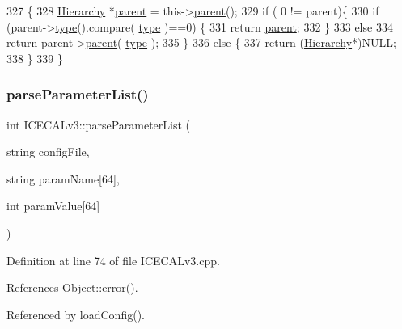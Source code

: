 \begin{DoxyCode}
327                                             \{
328   \hyperlink{classHierarchy}{Hierarchy} *\hyperlink{classHierarchy_a1c7bec8257e717f9c1465e06ebf845fc}{parent} = this->\hyperlink{classHierarchy_a1c7bec8257e717f9c1465e06ebf845fc}{parent}();
329   \textcolor{keywordflow}{if} ( 0 != parent)\{
330     \textcolor{keywordflow}{if} (parent->\hyperlink{classObject_a84f99f70f144a83e1582d1d0f84e4e62}{type}().compare( \hyperlink{classObject_a84f99f70f144a83e1582d1d0f84e4e62}{type} )==0) \{
331       \textcolor{keywordflow}{return} \hyperlink{classHierarchy_a1c7bec8257e717f9c1465e06ebf845fc}{parent};
332     \}
333     \textcolor{keywordflow}{else}
334       \textcolor{keywordflow}{return} parent->\hyperlink{classHierarchy_a1c7bec8257e717f9c1465e06ebf845fc}{parent}( \hyperlink{classObject_a84f99f70f144a83e1582d1d0f84e4e62}{type} );
335   \}
336   \textcolor{keywordflow}{else} \{
337     \textcolor{keywordflow}{return} (\hyperlink{classHierarchy}{Hierarchy}*)NULL;
338   \}
339 \}
\end{DoxyCode}
\mbox{\label{classICECALv3_a313e8166af1ce26b4026f883ad900fb9}} 
\subsubsection{\texorpdfstring{parse\+Parameter\+List()}{parseParameterList()}}
{\footnotesize\ttfamily int I\+C\+E\+C\+A\+Lv3\+::parse\+Parameter\+List (\begin{DoxyParamCaption}\item[{string}]{config\+File,  }\item[{string}]{param\+Name\mbox{[}64\mbox{]},  }\item[{int}]{param\+Value\mbox{[}64\mbox{]} }\end{DoxyParamCaption})\hspace{0.3cm}{\ttfamily [private]}}



Definition at line 74 of file I\+C\+E\+C\+A\+Lv3.\+cpp.



References Object\+::error().



Referenced by load\+Config().


